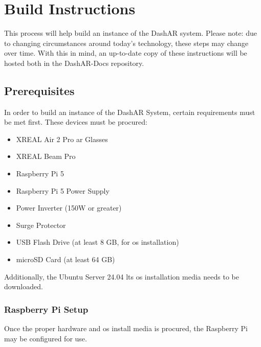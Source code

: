 \chapter{Build Instructions}
\label{appendix:build}

    \par This process will help build an instance of the DashAR system. Please note: due to changing circumstances around today's technology, these steps may change over time. With this in mind, an up-to-date copy of these instructions will be hosted both in the DashAR-Docs repository.

    \section{Prerequisites}
        \par In order to build an instance of the DashAR System, certain requirements must be met first. These devices must be procured:

        \begin{itemize}
            \item XREAL Air 2 Pro \gls{ar} Glasses
            \item XREAL Beam Pro
            \item Raspberry Pi 5
            \item Raspberry Pi 5 Power Supply
            \item Power Inverter (150W or greater)
            \item Surge Protector
            \item USB Flash Drive (at least 8 GB, for \gls{os} installation)
            \item microSD Card (at least 64 GB)
        \end{itemize}

        \par Additionally, the Ubuntu Server 24.04 \gls{lts} \gls{os} installation media needs to be downloaded.

        \subsection{Raspberry Pi Setup}
            \par Once the proper hardware and \gls{os} install media is procured, the Raspberry Pi may be configured for use.


